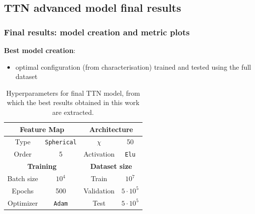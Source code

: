 \documentclass[xcolor=table,8pt]{beamer}
\begin{document}
    \subsection{TTN advanced model final results}
    \begin{frame}[t]
        \frametitle{Final results: model creation and metric plots}

        \textbf{Best model creation}:
        \begin{itemize}
            \item \alert{optimal configuration} (from characterisation) \alert{trained and tested using the full dataset}
        \end{itemize}
        
        \vspace{2pt}
        \begin{table}[!h]
            \centering
            {\scriptsize
                \begin{tabular}{cc||cc}
                    \toprule
                    \multicolumn{2}{c}{\textbf{Feature Map}} &
                    \multicolumn{2}{c}{\textbf{Architecture}} \\
                    \midrule
                    Type  & \texttt{Spherical}   & \( \chi \)   & 50     \\
                    Order    & 5   & Activation    & \texttt{Elu}      \\
                    \toprule
                    \multicolumn{2}{c}{\textbf{Training}} &
                    \multicolumn{2}{c}{\textbf{Dataset size}}  \\
                    \midrule
                    Batch size      & $10^4$  & Train   & $10^7$     \\
                    Epochs          & 500   & Validation    & $5\cdot10^5$      \\
                    Optimizer       & \texttt{Adam}   & Test    & $5\cdot10^5$      \\
                    \bottomrule
                \end{tabular}
            }
            \vspace{-2pt}
            \caption{Hyperparameters for final TTN model, from which the best results obtained in this work are extracted.}
            \label{tab:results_final_parameters}
        \end{table}


\end{frame}
\end{document}
